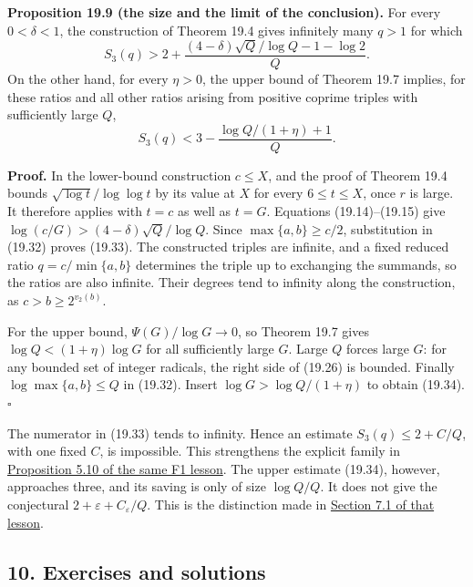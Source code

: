 \documentclass[
  11pt,
  a4paper,
]{article}
\begin{document}
\textbf{Proposition 19.9 (the size and the limit of the conclusion).}
For every \(0<\delta<1\), the construction of Theorem 19.4 gives
infinitely many \(q>1\) for which \[
 S_3(q)>2+
 \frac{(4-\delta)\sqrt Q/\log Q-1-\log2}{Q}.
 \tag{19.33}
\] On the other hand, for every \(\eta>0\), the upper bound of Theorem
19.7 implies, for these ratios and all other ratios arising from
positive coprime triples with sufficiently large \(Q\), \[
 S_3(q)<3-\frac{\log Q/(1+\eta)+1}{Q}.
 \tag{19.34}
\]

\textbf{Proof.} In the lower-bound construction \(c\le X\), and the
proof of Theorem 19.4 bounds \(\sqrt{\log t}/\log\log t\) by its value
at \(X\) for every \(6\le t\le X\), once \(r\) is large. It therefore
applies with \(t=c\) as well as \(t=G\). Equations (19.14)--(19.15) give
\(\log(c/G)>(4-\delta)\sqrt Q/\log Q\). Since \(\max\{a,b\}\ge c/2\),
substitution in (19.32) proves (19.33). The constructed triples are
infinite, and a fixed reduced ratio \(q=c/\min\{a,b\}\) determines the
triple up to exchanging the summands, so the ratios are also infinite.
Their degrees tend to infinity along the construction, as
\(c>b\ge2^{v_2(b)}\).

For the upper bound, \(\Psi(G)/\log G\to0\), so Theorem 19.7 gives
\(\log Q<(1+\eta)\log G\) for all sufficiently large \(G\). Large \(Q\)
forces large \(G\): for any bounded set of integer radicals, the right
side of (19.26) is bounded. Finally \(\log\max\{a,b\}\le Q\) in (19.32).
Insert \(\log G>\log Q/(1+\eta)\) to obtain (19.34). \(\square\)

The numerator in (19.33) tends to infinity. Hence an estimate
\(S_3(q)\le2+C/Q\), with one fixed \(C\), is impossible. This
strengthens the explicit family in
\href{https://kokunoyumeto.github.io/open-math-courses-public/courses/the-field-with-one-element/the-projective-line-over-f-1-and-the-abc-conjecture.html\#section-5.3}{Proposition
5.10 of the same F1 lesson}. The upper estimate (19.34), however,
approaches three, and its saving is only of size \(\log Q/Q\). It does
not give the conjectural \(2+\varepsilon+C_\varepsilon/Q\). This is the
distinction made in
\href{https://kokunoyumeto.github.io/open-math-courses-public/courses/the-field-with-one-element/the-projective-line-over-f-1-and-the-abc-conjecture.html\#section-7.1}{Section
7.1 of that lesson}.

\subsection{10. Exercises and solutions}\label{exercises-and-solutions}
\end{document}
